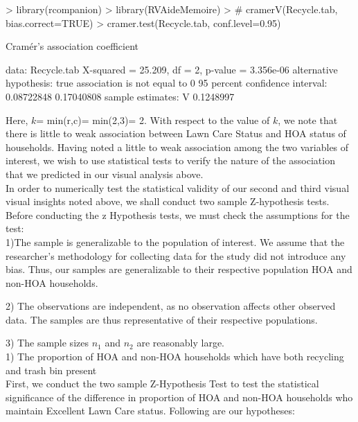\documentclass{article}
\begin{document}
\begin{Schunk}
\begin{Sinput}
> library(rcompanion)
> library(RVAideMemoire)
> # cramerV(Recycle.tab, bias.correct=TRUE)
> cramer.test(Recycle.tab, conf.level=0.95)
\end{Sinput}
\begin{Soutput}
	Cramér's association coefficient

data:  Recycle.tab
X-squared = 25.209, df = 2, p-value = 3.356e-06
alternative hypothesis: true association is not equal to 0
95 percent confidence interval:
 0.08722848 0.17040808
sample estimates:
        V 
0.1248997 
\end{Soutput}
\end{Schunk}

Here, $k$= min(r,c)= min(2,3)= 2. With respect to the value of $k$, we note that there is little to weak association between Lawn Care Status and HOA status of households. Having noted a little to weak association among the two variables of interest, we wish to use statistical tests to verify the nature of the association that we predicted in our visual analysis above.\\

In order to numerically test the statistical validity of our second and third visual visual insights noted above, we shall conduct two sample Z-hypothesis tests. Before conducting the z Hypothesis tests, we must check the assumptions for the test:\\

1)The sample is generalizable to the population of interest. We assume that the researcher's methodology for collecting data for the study did not introduce any bias. Thus, our samples are generalizable to their respective population HOA and non-HOA households.

2) The observations are independent, as no observation affects other observed data. The samples are thus representative of their respective populations.

3) The sample sizes $n_{1}$ and $n_{2}$ are reasonably large.\\

1) The proportion of HOA and non-HOA households which have both recycling and trash bin present\\

First, we conduct the two sample Z-Hypothesis Test to test the statistical significance of the difference in proportion of HOA and non-HOA households who maintain Excellent Lawn Care status. Following are our hypotheses:
\end{document}
